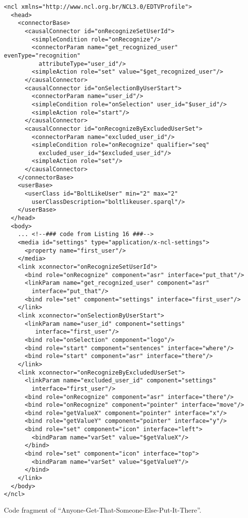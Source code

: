 \begin{verbatim}
<ncl xmlns="http://www.ncl.org.br/NCL3.0/EDTVProfile">
  <head>
    <connectorBase>
      <causalConnector id="onRecognizeSetUserId">
        <simpleCondition role="onRecognize"/>
        <connectorParam name="get_recognized_user" evenType="recognition"
          attributeType="user_id"/>
        <simpleAction role="set" value="$get_recognized_user"/>
      </causalConnector>
      <causalConnector id="onSelectionByUserStart">
        <connectorParam name="user_id"/>
        <simpleCondition role="onSelection" user_id="$user_id"/>
        <simpleAction role="start"/>
      </causalConnector>
      <causalConnector id="onRecognizeByExcludedUserSet">
        <connectorParam name="excluded_user_id"/>
        <simpleCondition role="onRecognize" qualifier="seq"
          excluded_user_id="$excluded_user_id"/>
        <simpleAction role="set"/>
      </causalConnector>
    </connectorBase>
    <userBase>
      <userClass id="BoltLikeUser" min="2" max="2"
        userClassDescription="boltlikeuser.sparql"/>
    </userBase>
  </head>
  <body>
    ... <!--### code from Listing 16 ###-->
    <media id="settings" type="application/x-ncl-settings">
      <property name="first_user"/>
    </media>
    <link xconnector="onRecognizeSetUserId">
      <bind role="onRecognize" component="asr" interface="put_that"/>
      <linkParam name="get_recognized_user" component="asr"
        interface="put_that"/>
      <bind role="set" component="settings" interface="first_user"/>
    </link>
    <link xconnector="onSelectionByUserStart">
      <linkParam name="user_id" component="settings"
         interface="first_user"/>
      <bind role="onSelection" component="logo"/>
      <bind role="start" component="sentences" interface="where"/>
      <bind role="start" component="asr" interface="there"/>
    </link>
    <link xconnector="onRecognizeByExcludedUserSet">
      <linkParam name="excluded_user_id" component="settings"
        interface="first_user"/>
      <bind role="onRecognize" component="asr" interface="there"/>
      <bind role="onRecognize" component="pointer" interface="move"/>
      <bind role="getValueX" component="pointer" interface="x"/>
      <bind role="getValueY" component="pointer" interface="y"/>
      <bind role="set" component="icon" interface="left">
        <bindParam name="varSet" value="$getValueX"/>
      </bind>
      <bind role="set" component="icon" interface="top">
        <bindParam name="varSet" value="$getValueY"/>
      </bind>
    </link>
  </body>
</ncl>
\end{verbatim}
\begin{listing}[!ht]
\caption{Code fragment of “Anyone-Get-That-Someone-Else-Put-It-There”.}
\label{list:annexb7}
\end{listing}
